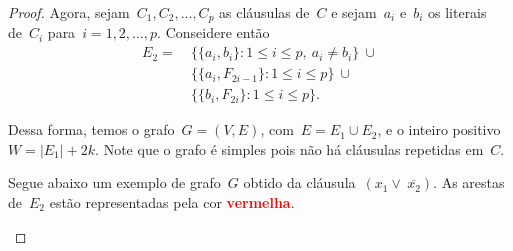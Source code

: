 \begin{proof}
		\bigskip 



		Agora, sejam~$C_1,C_2,\ldots,C_p$ as cláusulas de~$C$ e sejam~$a_i$
		e~$b_i$ os literais de~$C_i$ para~$i=1,2,\ldots,p$.
		Conseidere então
		\begin{align}
			E_2= \ &\{ \{a_i,b_i\}: 1\le i\le p,\ a_i\ne b_i \}\ \cup 
					\nonumber\\
				&\{\{a_i, F_{2i-1}\}: 1\le i\le p\}\ \cup \nonumber \\
				&\{\{b_i, F_{2i}\}: 1\le i\le p\}. \nonumber
		\end{align}


		Dessa forma, temos o grafo~${G = (V,E)}$, com~${E=E_1\cup E_2}$,
		e o inteiro positivo~${W = |E_1|+2k}$.
		Note que o grafo é simples pois não há cláusulas repetidas em~$C$.

		Segue abaixo um exemplo de grafo~$G$ obtido da
		cláusula~${(x_1\lor\ \overline{x_2})}$.
		As arestas de~$E_2$ estão representadas pela cor 
		\textcolor{red}{\textbf {vermelha}}.

		\bigskip
		\bigskip

		\begin{center} 
\end{center}
\end{proof}
